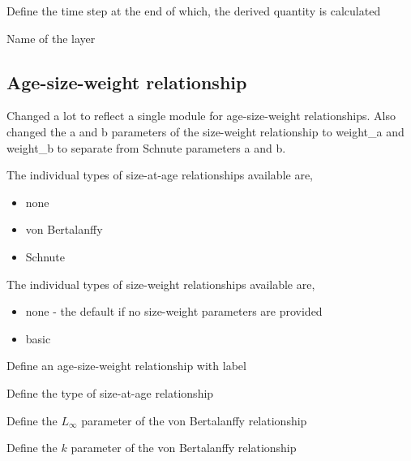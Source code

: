  {Define the time step at the end of which, the derived quantity is calculated}

 {Name of the layer}

\subsection{Age-size-weight relationship}

\TODO

Changed a lot to reflect a single module for age-size-weight relationships. Also changed the a and b parameters of the size-weight relationship to weight\_a and weight\_b to separate from Schnute parameters a and b.

The individual types of size-at-age relationships available are,

\begin{itemize}
	\item none
	\item von Bertalanffy
	\item Schnute
\end{itemize}

The individual types of size-weight relationships available are,

\begin{itemize}
  \item none - the default if no size-weight parameters are provided
	\item basic
\end{itemize}

 {Define an age-size-weight relationship with label}

 {Define the type of size-at-age relationship}

 {Define the $L_\infty$ parameter of the von Bertalanffy relationship}

 {Define the $k$ parameter of the von Bertalanffy relationship}


